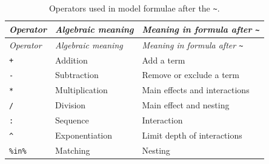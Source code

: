 \documentclass[
]{book}
\begin{document}
\begin{longtable}[]{@{}
  >{\raggedright\arraybackslash}p{}
  >{\raggedright\arraybackslash}p{}
  >{\raggedright\arraybackslash}p{}@{}}
\caption{\label{tab:ModelOperators} Operators used in model formulae after the \texttt{\textasciitilde{}}.}\tabularnewline
\toprule\noalign{}
\begin{minipage}[b]{\linewidth}\raggedright
\emph{{Operator}}
\end{minipage} & \begin{minipage}[b]{\linewidth}\raggedright
\emph{{Algebraic meaning}}
\end{minipage} & \begin{minipage}[b]{\linewidth}\raggedright
\emph{{Meaning in formula after \texttt{\textasciitilde{}}}}
\end{minipage} \\
\midrule\noalign{}
\endfirsthead
\toprule\noalign{}
\begin{minipage}[b]{\linewidth}\raggedright
\emph{{Operator}}
\end{minipage} & \begin{minipage}[b]{\linewidth}\raggedright
\emph{{Algebraic meaning}}
\end{minipage} & \begin{minipage}[b]{\linewidth}\raggedright
\emph{{Meaning in formula after \texttt{\textasciitilde{}}}}
\end{minipage} \\
\midrule\noalign{}
\endhead
\bottomrule\noalign{}
\endlastfoot
\texttt{+} & Addition & Add a term \\
\texttt{-} & Subtraction & Remove or exclude a term \\
\texttt{*} & Multiplication & Main effects and interactions \\
\texttt{/} & Division & Main effect and nesting \\
\texttt{:} & Sequence & Interaction \\
\texttt{\^{}} & Exponentiation & Limit depth of interactions \\
\texttt{\%in\%} & Matching & Nesting \\
\end{longtable}
\end{document}
